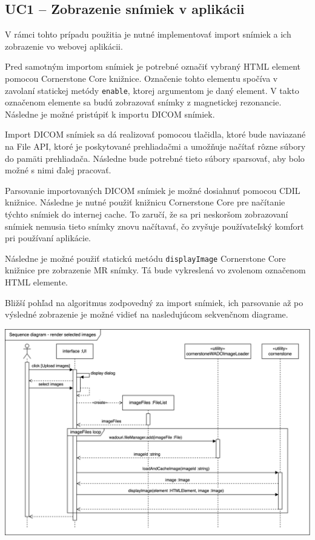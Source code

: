 \subsection {UC1 -- Zobrazenie snímiek v aplikácii}
V rámci tohto prípadu použitia je nutné implementovať import snímiek a ich zobrazenie vo webovej aplikácii.

Pred samotným importom snímiek je potrebné označiť vybraný HTML element pomocou Cornerstone Core knižnice. Označenie tohto elementu spočíva v zavolaní statickej metódy \texttt{enable}, ktorej argumentom je daný element. V takto označenom elemente sa budú zobrazovať snímky z magnetickej rezonancie. Následne je možné pristúpiť k importu DICOM snímiek.

Import DICOM snímiek sa dá realizovať pomocou tlačidla, ktoré bude naviazané na File API, ktoré je poskytované prehliadačmi a umožňuje načítať rôzne súbory do pamäti prehliadača. Následne bude potrebné tieto súbory sparsovať, aby bolo možné s nimi ďalej pracovať.

Parsovanie importovaných DICOM snímiek je možné dosiahnuť pomocou CDIL knižnice. Následne je nutné použiť knižnicu Cornerstone Core pre načítanie týchto snímiek do internej cache. To zaručí, že sa pri neskoršom zobrazovaní snímiek nemusia tieto snímky znovu načítavať, čo zvyšuje používateľský komfort pri používaní aplikácie.

Následne je možné použiť statickú metódu \texttt{displayImage} Cornerstone Core knižnice pre zobrazenie MR snímky. Tá bude vykreslená vo zvolenom označenom HTML elemente.

Bližší pohľad na algoritmus zodpovedný za import snímiek, ich parsovanie až po výsledné zobrazenie je možné vidieť na nasledujúcom sekvenčnom diagrame.

\begin {center}
        \centering
        \includegraphics[height=9cm]{media/graphs/render_images.png}
        \captionsetup{justification=centering}
\end {center}

